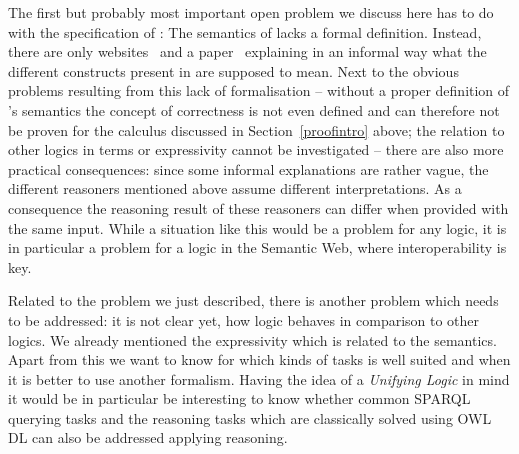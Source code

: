 The first but probably most important open problem we discuss here has to do with the specification of \nthreelogic: The semantics of \nthree lacks a formal definition. Instead, there are only websites~\cite{Notation3,Notation32} and a paper~\cite{N3Logic} explaining in 
an informal way what the different constructs present in \nthree are supposed to mean. Next to the obvious problems resulting from this lack of formalisation -- without a proper definition of \nthree's semantics 
the concept of correctness is not even defined and can therefore not be proven for the calculus discussed in Section~\ref{proofintro} above; the relation to other logics in terms or expressivity 
cannot be investigated -- there are also more practical consequences: since some informal explanations are rather vague, the different reasoners mentioned above assume different interpretations.  
As a consequence the reasoning result of these reasoners can differ when provided with the same input. While a situation like this would be a problem for any logic, 
it is in particular a problem for a logic in the Semantic Web, where interoperability is key. 

Related to the problem we just described, there is another problem which needs to be addressed: it is not clear yet, how \nthree logic behaves in comparison to other logics. 
We already mentioned the expressivity which is related to the semantics. Apart from this we want to know for which kinds of tasks \nthreelogic is well suited 
and when it is better to use another formalism. Having the idea of a \emph{Unifying Logic} in mind it would be in particular be interesting to 
know whether common SPARQL querying tasks 
and the reasoning tasks which are classically solved using OWL DL can also be addressed applying \nthree reasoning.

